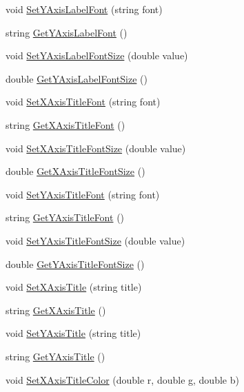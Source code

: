 \begin{DoxyCompactItemize}
\item 
void \hyperlink{class_c_plot2_d_ad049c24db7540f663bbd60719bc662ef}{Set\-Y\-Axis\-Label\-Font} (string font)
\item 
string \hyperlink{class_c_plot2_d_a9bca8d75be150e5c3a5949c499476279}{Get\-Y\-Axis\-Label\-Font} ()
\item 
void \hyperlink{class_c_plot2_d_a3cc26dd6fde04a7c3d2e6cd421d867b2}{Set\-Y\-Axis\-Label\-Font\-Size} (double value)
\item 
double \hyperlink{class_c_plot2_d_a7e1e1cfef6e974230ad27a80237a8d62}{Get\-Y\-Axis\-Label\-Font\-Size} ()
\item 
void \hyperlink{class_c_plot2_d_a1baa587e83bfc0d17ac16dec358489a4}{Set\-X\-Axis\-Title\-Font} (string font)
\item 
string \hyperlink{class_c_plot2_d_a2f68bec2d991fe7c663f325d06984eea}{Get\-X\-Axis\-Title\-Font} ()
\item 
void \hyperlink{class_c_plot2_d_a491a8d631c1d5d374a400b35c88932bf}{Set\-X\-Axis\-Title\-Font\-Size} (double value)
\item 
double \hyperlink{class_c_plot2_d_a18f906f11f5a408da28af4efc2ae7022}{Get\-X\-Axis\-Title\-Font\-Size} ()
\item 
void \hyperlink{class_c_plot2_d_a7e5301982fcd9fe026f73d188a0e6254}{Set\-Y\-Axis\-Title\-Font} (string font)
\item 
string \hyperlink{class_c_plot2_d_a778133d07b95794bba7b7d53a7053774}{Get\-Y\-Axis\-Title\-Font} ()
\item 
void \hyperlink{class_c_plot2_d_aad032548dfcb6ce5e6beecebacbaa393}{Set\-Y\-Axis\-Title\-Font\-Size} (double value)
\item 
double \hyperlink{class_c_plot2_d_a1e4d49b3f25bbcab89a276fe268ae2f8}{Get\-Y\-Axis\-Title\-Font\-Size} ()
\item 
void \hyperlink{class_c_plot2_d_a605188e3270dc38fc86c5043e9aeb3c0}{Set\-X\-Axis\-Title} (string title)
\item 
string \hyperlink{class_c_plot2_d_ab92accbdcea4cfed7ce29b071d13c801}{Get\-X\-Axis\-Title} ()
\item 
void \hyperlink{class_c_plot2_d_aceee702de947c4be3854e0cfd68b26f9}{Set\-Y\-Axis\-Title} (string title)
\item 
string \hyperlink{class_c_plot2_d_aaee9f63922173d6138f3aebc3032155c}{Get\-Y\-Axis\-Title} ()
\item 
void \hyperlink{class_c_plot2_d_adfebd2eb0a9784e7786205d4c0e4ac5a}{Set\-X\-Axis\-Title\-Color} (double r, double g, double b)
\item 

\end{DoxyCompactItemize}
